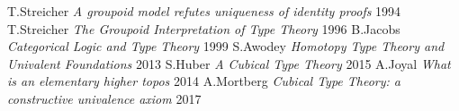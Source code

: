\documentclass[9pt]{memoir}
\begin{document}
\begin{fullwidth}[width=\linewidth+4cm]
\begin{thebibliography}{99}
 T.Streicher \textit{A groupoid model refutes uniqueness of identity proofs} 1994
  T.Streicher \textit{The Groupoid Interpretation of Type Theory} 1996
    B.Jacobs \textit{Categorical Logic and Type Theory} 1999
     S.Awodey \textit{Homotopy Type Theory and Univalent Foundations} 2013
      S.Huber \textit{A Cubical Type Theory} 2015
      A.Joyal \textit{What is an elementary higher topos} 2014
   A.Mortberg \textit{Cubical Type Theory: a constructive univalence axiom} 2017

\end{thebibliography}
\end{fullwidth}
\end{document}
